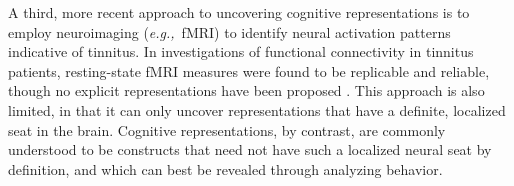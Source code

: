 \documentclass[11pt, notitlepage]{article} %
\def\eg{{\emph{e.g.,}}~}
\begin{document}
A third, more recent approach to uncovering cognitive representations is to employ neuroimaging
(\eg fMRI) to identify neural activation patterns indicative of tinnitus.
In investigations of functional connectivity in tinnitus patients,
resting-state fMRI measures were found to be replicable and reliable,
though no explicit representations have been proposed
\cite{husainReplicabilityNeuralBehavioral2019}.
This approach is also
limited, in that it can only uncover representations that have a definite, localized seat in the brain.
Cognitive representations, by contrast, are commonly understood to be constructs that need not have
such a localized neural seat by definition, and which can best be revealed through analyzing behavior.

\end{document}

